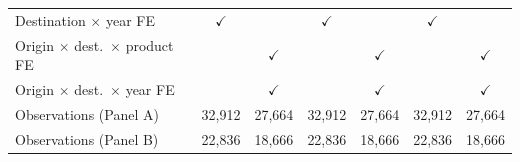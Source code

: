 \begin{tabular}{lcccccc}
Destination $\times$ year FE & $\checkmark$ &  & $\checkmark$ &  & $\checkmark$ &  \\
Origin $\times$ dest.\ $\times$ product FE &  & $\checkmark$ &  & $\checkmark$ &  & $\checkmark$ \\
Origin $\times$ dest.\ $\times$ year FE &  & $\checkmark$ &  & $\checkmark$ &  & $\checkmark$ \\
Observations (Panel A) & 32,912 & 27,664 & 32,912 & 27,664 & 32,912 & 27,664 \\
Observations (Panel B) & 22,836 & 18,666 & 22,836 & 18,666 & 22,836 & 18,666 \\
\hline
\end{tabular}

